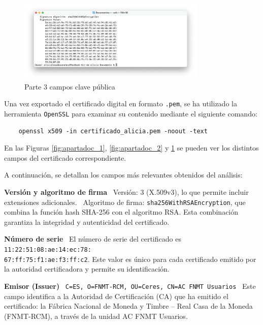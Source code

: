 \begin{figure}[H]
    \centering
    \includegraphics[width=0.8\textwidth]{apartadoc_3.png}
    \caption{Parte 3 campos clave pública}
    \label{fig:apartadoc_3}
\end{figure}

Una vez exportado el certificado digital en formato \texttt{.pem}, se ha utilizado la herramienta \texttt{OpenSSL} para examinar su contenido mediante el siguiente comando:


\begin{verbatim}
    openssl x509 -in certificado_alicia.pem -noout -text
\end{verbatim}



En las Figuras \ref{fig:apartadoc_1}, \ref{fig:apartadoc_2} y \ref{fig:apartadoc_3} se pueden ver los distintos campos del certificado correspondiente.  

A continuación, se detallan los campos más relevantes obtenidos del análisis:

\textbf{Versión y algoritmo de firma} \ Versión: 3 (X.509v3), lo que permite incluir extensiones adicionales. \ Algoritmo de firma: \texttt{sha256WithRSAEncryption}, que combina la función hash SHA-256 con el algoritmo RSA. Esta combinación garantiza la integridad y autenticidad del certificado.

\textbf{Número de serie} \ El número de serie del certificado es \texttt{11:22:51:08:ae:14:ec:78:\\67:ff:75:f1:ae:f3:ff:c2}. Este valor es único para cada certificado emitido por la autoridad certificadora y permite su identificación.

\textbf{Emisor (Issuer)} \ \texttt{C=ES, O=FNMT-RCM, OU=Ceres, CN=AC FNMT Usuarios} \ Este campo identifica a la Autoridad de Certificación (CA) que ha emitido el certificado: la Fábrica Nacional de Moneda y Timbre – Real Casa de la Moneda (FNMT-RCM), a través de la unidad AC FNMT Usuarios.

